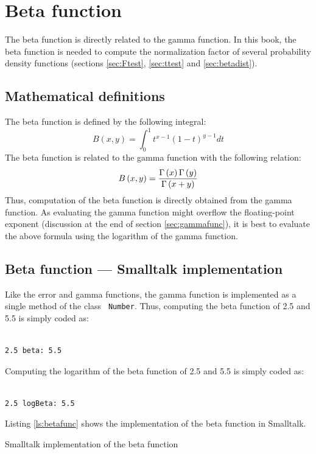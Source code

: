 \documentclass[twoside]{book}
\begin{document}
\section{Beta function}
\label{sec:betafunc} The beta function is directly related to the
gamma function. In this book, the beta function is needed to
compute the normalization factor of several probability density
functions (\cf sections \ref{sec:Ftest}, \ref{sec:ttest} and
\ref{sec:betadist}).
\subsection{Mathematical definitions}
The beta function is defined by the following integral:
\begin{equation}
\label{eq:betaint} B\left(x,y\right)=\int_0^1
t^{x-1}\left(1-t\right)^{y-1}dt
\end{equation}
The beta function is related to the gamma function with the
following relation:
\begin{equation}
B\left(x,y\right)={\Gamma\left(x\right)\Gamma\left(y\right)\over\Gamma\left(x+y\right)}
\end{equation}
Thus, computation of the beta function is directly obtained from
the gamma function. As evaluating the gamma function might
overflow the floating-point exponent (\cf discussion at the end of
section \ref{sec:gammafunc}), it is best to evaluate the above
formula using the logarithm of the gamma function.

\subsection{Beta function --- Smalltalk implementation}
 Like the error and gamma functions, the
gamma function is implemented as a single method of the class {\tt
Number}. Thus, computing the beta function of 2.5 and 5.5 is
simply coded as:
\begin{codeExample}
\begin{verbatim}

2.5 beta: 5.5
\end{verbatim}
\end{codeExample} Computing the logarithm of the beta function of
2.5 and 5.5 is simply coded as:
\begin{codeExample}
\begin{verbatim}

2.5 logBeta: 5.5
\end{verbatim}
\end{codeExample}
Listing \ref{ls:betafunc} shows the
implementation of the beta function in Smalltalk.

\begin{listing}
Smalltalk implementation of the beta function
\label{ls:betafunc}

\end{listing}

\ifx\wholebook\relax\else
\end{document}
